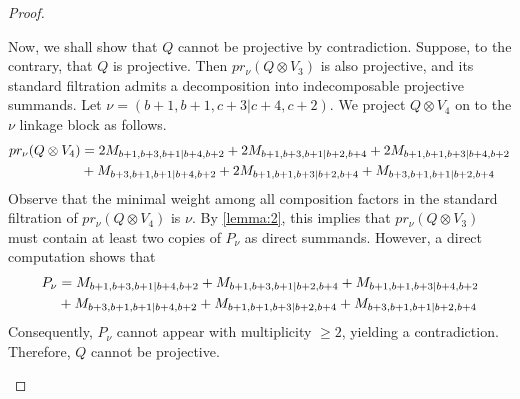\begin{proof}
\begin{enumerate}
\begin{enumerate}
Now, we shall show that $Q$ cannot be projective by contradiction.
Suppose, to the contrary, that $Q$ is projective. Then $pr_\nu(Q \otimes V_3)$ is also projective, and its standard filtration admits a decomposition into indecomposable projective summands.
Let $\nu = (b+1,b+1,c+3|c+4,c+2)$. We project $Q \otimes V_4$ on to the $\nu$ linkage block as follows.
\begin{equation}\notag
  \begin{aligned}
    pr_\nu(Q \otimes V_4) &= 
2M_{b+1,b+3,b+1|b+4,b+2}
+2M_{b+1,b+3,b+1|b+2,b+4}
+2M_{b+1,b+1,b+3|b+4,b+2}\\
                                              &
+M_{b+3,b+1,b+1|b+4,b+2}
+2M_{b+1,b+1,b+3|b+2,b+4}
+M_{b+3,b+1,b+1|b+2,b+4}
  \end{aligned}
\end{equation}
Observe that the minimal weight among all composition factors in the standard filtration of $pr_\nu(Q \otimes V_4)$ is $\nu$. By \cref{lemma:2}, this implies that $pr_\nu(Q \otimes V_3)$ must contain at least two copies of $P_\nu$ as direct summands. However, a direct computation shows that
  \begin{equation}\notag
    \begin{aligned}
      P_\nu &=
M_{b+1,b+3,b+1|b+4,b+2}
+M_{b+1,b+3,b+1|b+2,b+4}
+M_{b+1,b+1,b+3|b+4,b+2}\\
                                              &
+M_{b+3,b+1,b+1|b+4,b+2}
+M_{b+1,b+1,b+3|b+2,b+4}
+M_{b+3,b+1,b+1|b+2,b+4}
    \end{aligned}
  \end{equation}
Consequently, $P_\nu$ cannot appear with multiplicity $\geq 2$, yielding a contradiction. Therefore, $Q$ cannot be projective.


\end{enumerate}
\end{enumerate}
\end{proof}
